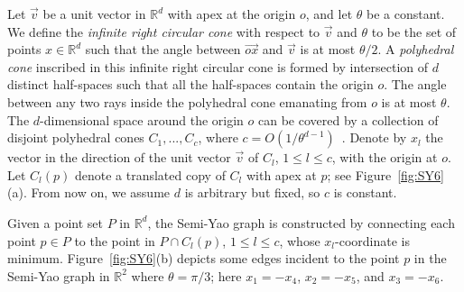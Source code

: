 \documentclass[11pt]{llncs}
\begin{document}
Let $\overrightarrow{v}$ be a unit vector in $\mathbb{R}^d$ with apex at the origin $o$, and let $\theta$ be a constant. We define the \textit{infinite right circular cone} with respect to $\overrightarrow{v}$ and $\theta$ to be the set of points $x\in \mathbb{R}^d$ such that the angle between $\overrightarrow{ox}$ and $\overrightarrow{v}$ is at most $\theta/2$. A \textit{polyhedral cone} inscribed in this infinite right circular cone is formed by intersection of $d$ distinct half-spaces such that all the half-spaces contain the origin $o$. The angle between any two rays inside the polyhedral cone emanating from $o$ is at most $\theta$. 
The $d$-dimensional space around the origin $o$ can be covered by a collection of disjoint polyhedral cones $C_1,...,C_c$, where $c=O(1/\theta^{d-1})$~\cite{Agarwal:2008:KDD:1435375.1435379,Abam:2011:KSX:1971362.1971367}. Denote by $x_l$ the vector in the direction of the unit vector $\overrightarrow{v}$ of $C_l$, $1\leq l\leq c$,  with the origin at $o$. Let $C_l(p)$ denote a translated copy of $C_l$ with apex at $p$; see Figure~\ref{fig:SY6}(a). From now on, we assume $d$ is arbitrary but fixed, so $c$ is constant.

Given a point set $P$ in $\mathbb{R}^d$, the Semi-Yao graph is constructed by connecting each point $p\in P$ to the point in $P\cap C_l(p)$, $1\leq l\leq c$, whose $x_l$-coordinate is minimum. Figure~\ref{fig:SY6}(b) depicts some edges incident to the point $p$ in the Semi-Yao graph in $\mathbb{R}^2$ where $\theta=\pi/3$; here $x_1=-x_4$, $x_2=-x_5$, and $x_3=-x_6$.
\end{document}
